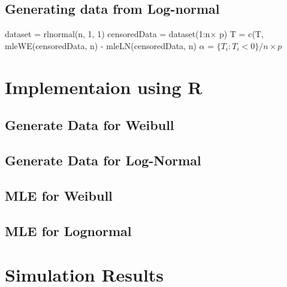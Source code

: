 \documentclass[twoside]{article}
\begin{document}
\begin{multicols}{2}
\subsection{Generating data from Log-normal}
\begin{algorithm}[H]
  dataset = rlnormal(n, 1, 1)\;
  censoredData = dataset(1:n$\times$ p)\;
  T = c(T, mleWE(censoredData, n) - mleLN(censoredData, n)\;
  $\alpha$ = $\{T_i : T_i < 0\}/n\times p$\;
\end{algorithm}

\section{Implementaion using R}
\subsection{Generate Data for Weibull}

\subsection{Generate Data for Log-Normal}

\subsection{MLE for Weibull}

\subsection{MLE for Lognormal}

\section{Simulation Results}

\end{multicols}
\end{document}
